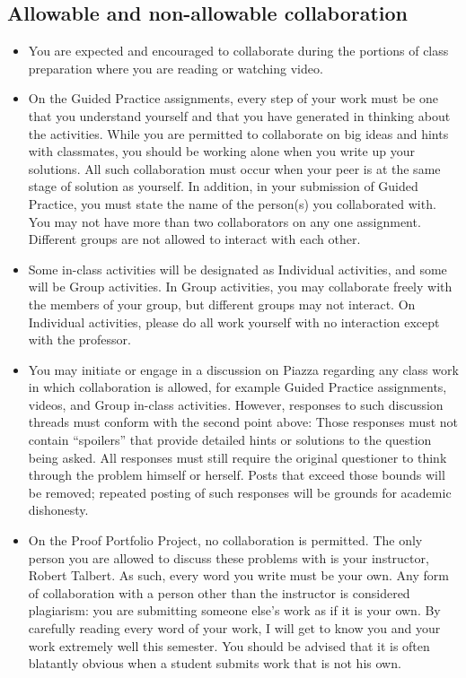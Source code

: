 \documentclass[11pt]{article}
\begin{document}
\subsection{Allowable and non-allowable collaboration}

\begin{itemize}[itemsep=0pt]
	\item You are expected and encouraged to collaborate during the portions of class preparation where you are reading or watching video. 
	\item On the Guided Practice assignments, every step of your work must be one that you understand yourself and that you have generated in thinking about the activities. While you are permitted to collaborate on big ideas and hints with classmates, you should be working alone when you write up your solutions. All such collaboration must occur when your peer is at the same stage of solution as yourself. In addition, in your submission of Guided Practice, you must state the name of the person(s) you collaborated with. You may not have more than two collaborators on any one assignment. Different groups are not allowed to interact with each other. 
	\item Some in-class activities will be designated as Individual activities, and some will be Group activities. In Group activities, you may collaborate freely with the members of your group, but different groups may not interact. On Individual activities, please do all work yourself with no interaction except with the professor. 
	\item You may initiate or engage in a discussion on Piazza regarding any class work in which collaboration is allowed, for example Guided Practice assignments, videos, and Group in-class activities. However, responses to such discussion threads must conform with the second point above: Those responses must not contain ``spoilers'' that provide detailed hints or solutions to the question being asked. All responses must still require the original questioner to think through the problem himself or herself. Posts that exceed those bounds will be removed; repeated posting of such responses will be grounds for academic dishonesty. 
	\item On the Proof Portfolio Project, no collaboration is permitted. The only person you are allowed to discuss these problems with is your instructor, Robert Talbert. As such, every word you write must be your own. Any form of collaboration with a person other than the instructor is considered plagiarism: you are submitting someone else’s work as if it is your own. By carefully reading every word of your work, I will get to know you and your work extremely well this semester. You should be advised that it is often blatantly obvious when a student submits work that is not his own.

\end{itemize}
\end{document}
